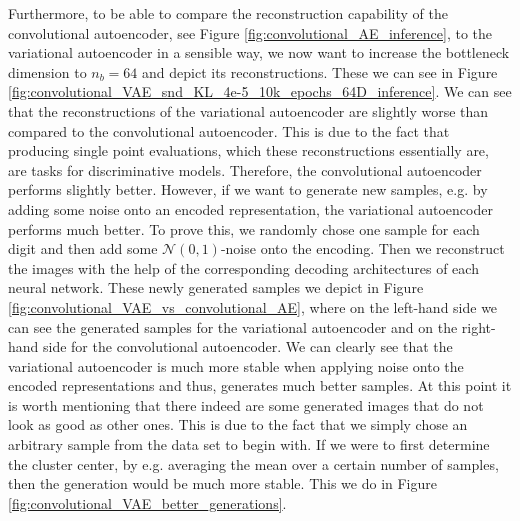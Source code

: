 Furthermore, to be able to compare the reconstruction capability of the convolutional autoencoder, see Figure \ref{fig:convolutional_AE_inference}, to the variational autoencoder in a sensible way, we now want to increase the bottleneck dimension to $n_b=64$ and depict its reconstructions. These we can see in Figure \ref{fig:convolutional_VAE_snd_KL_4e-5_10k_epochs_64D_inference}. We can see that the reconstructions of the variational autoencoder are slightly worse than compared to the convolutional autoencoder. This is due to the fact that producing single point evaluations, which these reconstructions essentially are, are tasks for discriminative models. Therefore, the convolutional autoencoder performs slightly better. However, if we want to generate new samples, e.g. by adding some noise onto an encoded representation, the variational autoencoder performs much better. To prove this, we randomly chose one sample for each digit and then add some $\mathcal{N}(0, 1)$-noise onto the encoding. Then we reconstruct the images with the help of the corresponding decoding architectures of each neural network. These newly generated samples we depict in Figure \ref{fig:convolutional_VAE_vs_convolutional_AE}, where on the left-hand side we can see the generated samples for the variational autoencoder and on the right-hand side for the convolutional autoencoder. We can clearly see that the variational autoencoder is much more stable when applying noise onto the encoded representations and thus, generates much better samples. At this point it is worth mentioning that there indeed are some generated images that do not look as good as other ones. This is due to the fact that we simply chose an arbitrary sample from the data set to begin with. If we were to first determine the cluster center, by e.g. averaging the mean over a certain number of samples, then the generation would be much more stable. This we do in Figure \ref{fig:convolutional_VAE_better_generations}.

